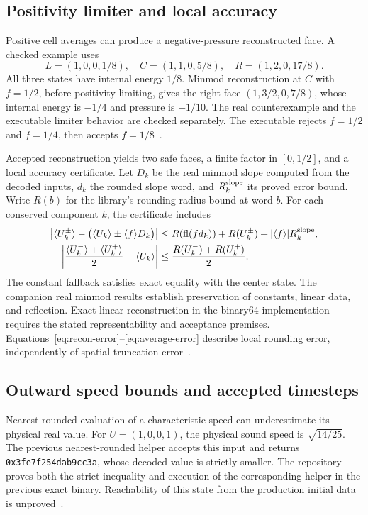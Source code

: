 \documentclass[11pt]{article}
\newcommand{\code}[1]{\texttt{#1}}
\newcommand{\val}[1]{\langle #1\rangle}
\newcommand{\fl}{\operatorname{fl}}
\begin{document}
\subsection{Positivity limiter and local accuracy}

Positive cell averages can produce a negative-pressure reconstructed face.  A checked example uses
\begin{equation}
L=(1,0,0,1/8),\quad C=(1,1,0,5/8),\quad R=(1,2,0,17/8).
\end{equation}
All three states have internal energy $1/8$.  Minmod reconstruction at $C$ with $f=1/2$, before positivity limiting, gives the right face $(1,3/2,0,7/8)$, whose internal energy is $-1/4$ and pressure is $-1/10$.  The real counterexample and the executable limiter behavior are checked separately.  The executable rejects $f=1/2$ and $f=1/4$, then accepts $f=1/8$~\cite{counterexample}.

Accepted reconstruction yields two safe faces, a finite factor in $[0,1/2]$, and a local accuracy certificate.  Let $D_k$ be the real minmod slope computed from the decoded inputs, $d_k$ the rounded slope word, and $R_k^{\rm slope}$ its proved error bound.  Write $R(b)$ for the library's rounding-radius bound at word $b$.  For each conserved component $k$, the certificate includes
\begin{align}
\left|\val{U_k^{\pm}}-\bigl(\val{U_k}\pm\val{f}D_k\bigr)\right|
&\leq R(\fl(fd_k))+R(U_k^{\pm})+|\val{f}|R_k^{\rm slope},\label{eq:recon-error}\\
\left|\frac{\val{U_k^-}+\val{U_k^+}}2-\val{U_k}\right|
&\leq\frac{R(U_k^-)+R(U_k^+)}2.\label{eq:average-error}
\end{align}
The constant fallback satisfies exact equality with the center state.  The companion real minmod results establish preservation of constants, linear data, and reflection.  Exact linear reconstruction in the binary64 implementation requires the stated representability and acceptance premises.  Equations~\eqref{eq:recon-error}--\eqref{eq:average-error} describe local rounding error, independently of spatial truncation error~\cite{reconstructionaccuracy}.

\subsection{Outward speed bounds and accepted timesteps}

Nearest-rounded evaluation of a characteristic speed can underestimate its physical real value.  For $U=(1,0,0,1)$, the physical sound speed is $\sqrt{14/25}$.  The previous nearest-rounded helper accepts this input and returns \code{0x3fe7f254dab9cc3a}, whose decoded value is strictly smaller.  The repository proves both the strict inequality and execution of the corresponding helper in the previous exact binary.  Reachability of this state from the production initial data is unproved~\cite{speedcounterexample}.
\end{document}
